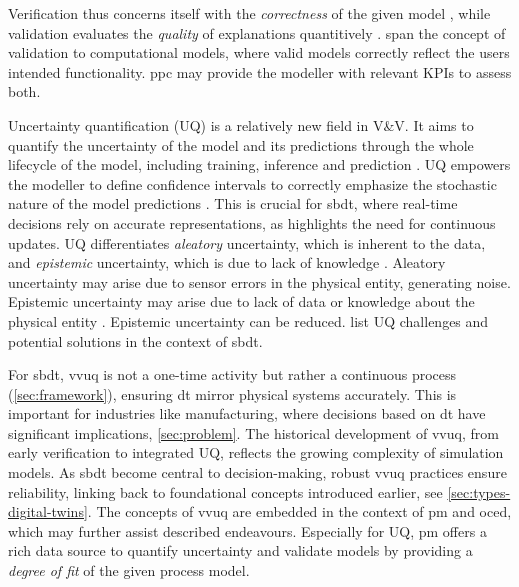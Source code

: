 Verification thus concerns itself with the \textit{correctness} of the given model \autocite{Sargent2010wsc}, while validation evaluates the \textit{quality} of explanations quantitively \autocite{Oberkampf2004amr}. \Textcite{iso2017systems} span the concept of validation to computational models, where valid models correctly reflect the users intended functionality. \gls{ppc} may provide the modeller with relevant KPIs to assess both.

\label{sec:uncertainty-quantification}
Uncertainty quantification (UQ) is a relatively new field in V\&V. It aims to quantify the uncertainty of the model and its predictions through the whole lifecycle of the model, including training, inference and prediction \autocite{sel2025survey}. UQ empowers the modeller to define confidence intervals to correctly emphasize the stochastic nature of the model predictions \autocite{volodina2021importance}. This is crucial for \gls{sbdt}, where real-time decisions rely on accurate representations, as \textcite{francis2021towards} highlights the need for continuous updates. UQ differentiates \textit{aleatory} uncertainty, which is inherent to the data, and \textit{epistemic} uncertainty, which is due to lack of knowledge \autocite{sel2025survey}. Aleatory uncertainty may arise due to sensor errors in the physical entity, generating noise. Epistemic uncertainty may arise due to lack of data or knowledge about the physical entity \autocite{thelen2023comprehensive}. Epistemic uncertainty can be reduced. \Textcite{abdoune2022handling} list UQ challenges and potential solutions in the context of \gls{sbdt}.

For \gls{sbdt}, \gls{vvuq} is not a one-time activity but rather a continuous process (\autoref{sec:framework}), ensuring \gls{dt} mirror physical systems accurately. This is important for industries like manufacturing, where decisions based on \gls{dt} have significant implications, \autoref{sec:problem}.
The historical development of \gls{vvuq}, from early verification to integrated UQ, reflects the growing complexity of simulation models. As \gls{sbdt} become central to decision-making, robust \gls{vvuq} practices ensure reliability, linking back to foundational concepts introduced earlier, see \autoref{sec:types-digital-twins}. The concepts of \gls{vvuq} are embedded in the context of \gls{pm} and \gls{oced}, which may further assist described endeavours. Especially for UQ, \gls{pm} offers a rich data source to quantify uncertainty and validate models by providing a \textit{degree of fit} of the given process model.


